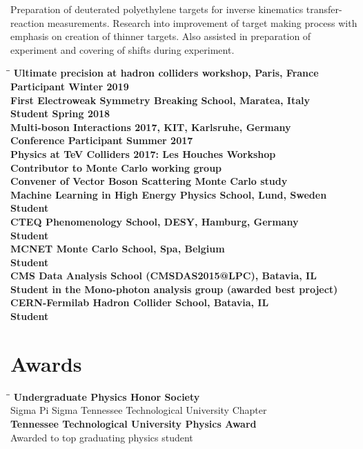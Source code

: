 \documentclass[10pt]{res} %
\begin{document}
\begin{resume}
Preparation of deuterated polyethylene targets for inverse kinematics 
transfer-reaction measurements. Research into improvement of 
target making process with emphasis on creation of thinner targets. 
Also assisted in preparation of experiment and covering of shifts 
during experiment.
\vspace{-0.1in}
\begin{tabbing}
\hspace{2.3in}\= \hspace{2.6in}\= \kill %
\bf{Ultimate precision at hadron colliders workshop, Paris, France}		\\
  Participant \>\> Winter 2019 \\
\bf{First Electroweak Symmetry Breaking School, Maratea, Italy}		\\
  Student \>\> Spring 2018 \\
\bf{Multi-boson Interactions 2017, KIT, Karlsruhe, Germany}		\\
  Conference Participant \>\> Summer 2017 \\
\bf{Physics at TeV Colliders 2017: Les Houches Workshop}		\\
  Contributor to Monte Carlo working group \>\\
  Convener of Vector Boson Scattering Monte Carlo study \\
\bf{Machine Learning in High Energy Physics School, Lund, Sweden}		\\
  Student \>\\
\bf{CTEQ Phenomenology School, DESY, Hamburg, Germany}		\\
  Student \>\\
\bf{MCNET Monte Carlo School, Spa, Belgium}		\\
  Student \>\\
\bf{CMS Data Analysis School (CMSDAS2015@LPC), Batavia, IL}		\\
  Student in the Mono-photon analysis group (awarded best project) \>\\
\bf{CERN-Fermilab Hadron Collider School, Batavia, IL}		\\
  Student \>\\
\end{tabbing}
	

\section{Awards}
\vspace{-0.1in}
\begin{tabbing}
\hspace{2.3in}\= \hspace{2.6in}\= \kill %
\textbf{Undergraduate Physics Honor Society} \>\\
Sigma Pi Sigma Tennessee Technological University Chapter 	    \\
\textbf{Tennessee Technological University Physics Award} 				\>\>{Spring 2013 }\\
Awarded to top graduating physics student \\
\end{tabbing}


\end{resume}
\end{document}
